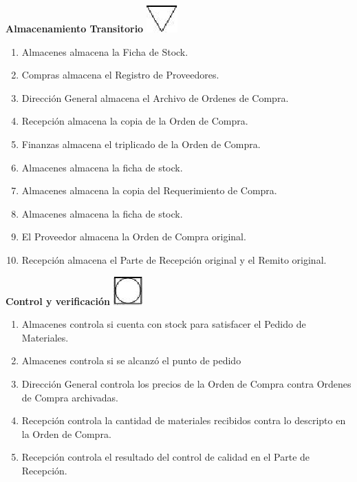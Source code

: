 \begin{center}
  \textbf{Almacenamiento Transitorio}
  \includegraphics{./Images/Simbolos/simbolo-Almacenamiento-Transitorio.png}
\end{center}
\begin{enumerate}
  \item Almacenes almacena la Ficha de Stock.
  \item Compras almacena el Registro de Proveedores.
  \item Dirección General almacena el Archivo de Ordenes de Compra.
  \item Recepción almacena la copia de la Orden de Compra.
  \item Finanzas almacena el triplicado de la Orden de Compra.
  \item Almacenes almacena la ficha de stock.
  \item Almacenes almacena la copia del Requerimiento de Compra.
  \item Almacenes almacena la ficha de stock.
  \item El Proveedor almacena la Orden de Compra original.
  \item Recepción almacena el Parte de Recepción original y el Remito original.
\end{enumerate}

\begin{center}
  \textbf{Control y verificación}
  \includegraphics{./Images/Simbolos/simbolo-Control-y-Verificacion.png}
\end{center}
\begin{enumerate}
  \item Almacenes controla si cuenta con stock para satisfacer el Pedido de Materiales.
  \item Almacenes controla si se alcanzó el punto de pedido
  \item Dirección General controla los precios de la Orden de Compra contra Ordenes de Compra archivadas.
  \item Recepción controla la cantidad de materiales recibidos contra lo descripto en la Orden de Compra.
  \item Recepción controla el resultado del control de calidad en el Parte de Recepción.
\end{enumerate}

